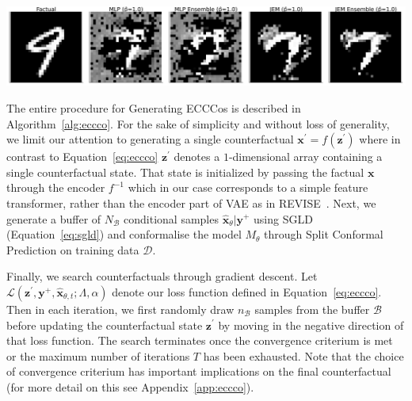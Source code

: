 \documentclass{article}
\begin{document}
\medskip

\begin{minipage}[c]{\textwidth}
  \includegraphics[width=\textwidth]{../artifacts/results/images/mnist_eccco.png}
  \label{fig:eccco-mnist}
\end{minipage}

\medskip

The entire procedure for Generating ECCCos is described in Algorithm~\ref{alg:eccco}. For the sake of simplicity and without loss of generality, we limit our attention to generating a single counterfactual $\mathbf{x}^\prime=f(\mathbf{z}^\prime)$ where in contrast to Equation~\ref{eq:eccco} $\mathbf{z}^\prime$ denotes a $1$-dimensional array containing a single counterfactual state. That state is initialized by passing the factual $\mathbf{x}$ through the encoder $f^{-1}$ which in our case corresponds to a simple feature transformer, rather than the encoder part of VAE as in REVISE~\citep{joshi2019realistic}. Next, we generate a buffer of $N_{\mathcal{B}}$ conditional samples $\hat{\mathbf{x}}_{\theta}|\mathbf{y}^+$ using SGLD (Equation~\ref{eq:sgld}) and conformalise the model $M_{\theta}$ through Split Conformal Prediction on training data $\mathcal{D}$.

Finally, we search counterfactuals through gradient descent. Let $\mathcal{L}(\mathbf{z}^\prime,\mathbf{y}^+,\hat{\mathbf{x}}_{\theta, t}; \Lambda, \alpha)$ denote our loss function defined in Equation~\ref{eq:eccco}. Then in each iteration, we first randomly draw $n_{\mathcal{B}}$ samples from the buffer $\mathcal{B}$ before updating the counterfactual state $\mathbf{z}^\prime$ by moving in the negative direction of that loss function. The search terminates once the convergence criterium is met or the maximum number of iterations $T$ has been exhausted. Note that the choice of convergence criterium has important implications on the final counterfactual (for more detail on this see Appendix~\ref{app:eccco}).
\end{document}
